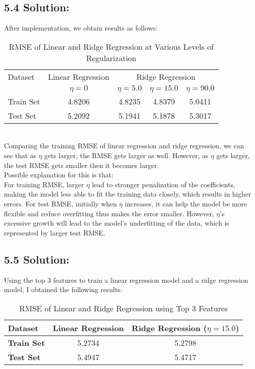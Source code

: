 \documentclass{article}
\begin{document}
\subsection*{5.4 Solution:}
After implementation, we obtain results as follows:
\begin{table}[h]
    \centering
    \caption{RMSE of Linear and Ridge Regression at Various Levels of Regularization}
    \label{tab:my_label}
    \begin{tabular}{@{}lcccc@{}}
    \toprule
    Dataset & Linear Regression & \multicolumn{3}{c}{Ridge Regression} \\
    \cmidrule(l){2-2} \cmidrule(l){3-5}
    & $\eta = 0$ & $\eta = 5.0$ & $\eta = 15.0$ & $\eta = 90.0$ \\
    \midrule
    Train Set & 4.8206 & 4.8235 & 4.8379 & 5.0411 \\
    Test Set  & 5.2092 & 5.1941 & 5.1878 & 5.3017 \\
    \bottomrule
    \end{tabular}
    \end{table}\\
Comparing the training RMSE of linear regression and ridge regression, we can see that as $\eta$ gets larger, the RMSE gets larger as well. 
However, as $\eta$ gets larger, the test RMSE gets smaller then it becomes larger. \\
Possible explanation for this is that:\\
For training RMSE, larger $\eta$ lead to stronger penalization of the coefficients, making the model less able to fit the training data closely, which results in higher errors.
For test RMSE, initially when $\eta$ increases, it can help the model be more flexible and reduce overfitting thus makes the error smaller. However, $\eta$'s excessive growth will lead to the model's underfitting of the data, which is represented by larger test RMSE.

\subsection*{5.5 Solution:}
Using the top 3 features to train a linear regression model and a ridge regression model, I obtained the following results:

\begin{table}[h]
    \centering
    \caption{RMSE of Linear and Ridge Regression using Top 3 Features}
    \label{tab:rmse_top3}
    \begin{tabular}{lcc}
    \toprule
    \textbf{Dataset}  & \textbf{Linear Regression} & \textbf{Ridge Regression ($\eta = 15.0$)} \\
    \midrule
    \textbf{Train Set} & 5.2734 & 5.2798 \\
    \textbf{Test Set}  & 5.4947 & 5.4717 \\
    \bottomrule
    \end{tabular}
\end{table}
\end{document}
